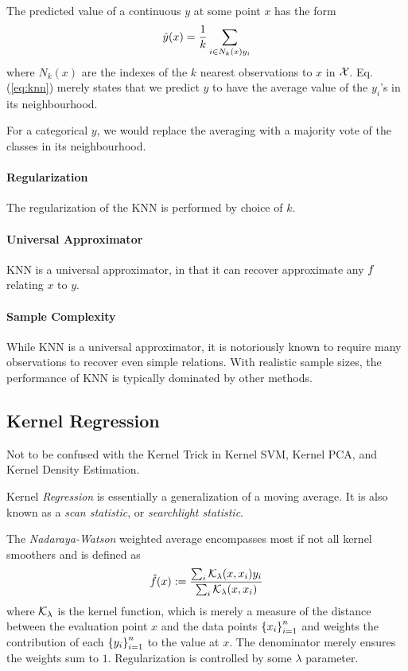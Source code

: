 The predicted value of a continuous $y$ at some point $x$ has the form
\begin{align}
\label{eq:knn}
	\hat{y}(x)=\frac{1}{k}\sum_{i \in N_k(x) y_i}
\end{align}
where $N_k(x)$ are the indexes of the $k$ nearest observations to $x$ in $\mathcal{X}$.
Eq.(\ref{eq:knn}) merely states that we predict $y$ to have the average value of the $y_i$'s in its neighbourhood.

For a categorical $y$, we would replace the averaging with a majority vote of the classes in its neighbourhood.

\paragraph{Regularization}
The regularization of the KNN is performed by choice of $k$.

\paragraph{Universal Approximator}
KNN is a universal approximator, in that it can recover approximate any $f$ relating $x$ to $y$.

\paragraph{Sample Complexity}
While KNN is a universal approximator, it is notoriously known to require many observations to recover even simple relations. With realistic sample sizes, the performance of KNN is typically dominated by other methods.




\subsection{Kernel Regression}
\label{sec:kernel}

Not to be confused with the Kernel Trick in Kernel SVM, Kernel PCA, and Kernel Density Estimation.

Kernel \emph{Regression} is essentially a generalization of a moving average.
It is also known as a \emph{scan statistic}, or \emph{searchlight statistic}.

The \emph{Nadaraya-Watson} weighted average encompasses most if not all kernel smoothers and is defined as 
\begin{align}
\label{eq:nadaraya_watson}
	\hat{f}(x):= \frac{\sum_i \mathcal{K}_\lambda(x,x_i)y_i}{\sum_i \mathcal{K}_\lambda(x,x_i)}
\end{align}
where $\mathcal{K}_\lambda$ is the kernel function, which is merely a measure of the distance between the evaluation point $x$ and the data points $\left\{  x_i  \right\}_{i=1}^n$ and weights the contribution of each $\left\{  y_i  \right\}_{i=1}^n$ to the value at $x$.
The denominator merely ensures the weights sum to $1$.
Regularization is controlled by some $\lambda$ parameter.

